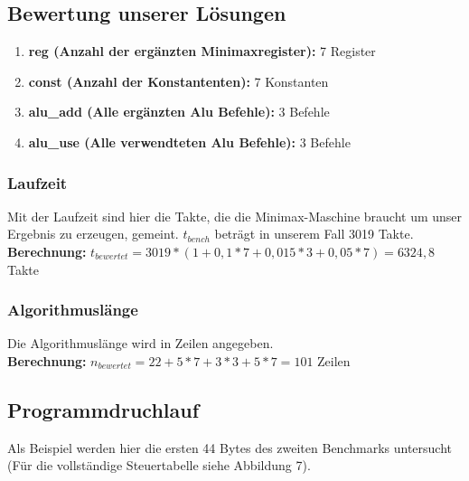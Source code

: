\documentclass[12pt,titlepage]{article}
\begin{document}
\subsection{Bewertung unserer Lösungen}

\begin{enumerate}
\item \textbf{reg (Anzahl der ergänzten Minimaxregister): } 7 Register
\item \textbf{const (Anzahl der Konstantenten): } 7 Konstanten
\item \textbf{alu\_add (Alle erg{\"a}nzten Alu Befehle):} 3 Befehle
\item \textbf{alu\_use (Alle verwendteten Alu Befehle):} 3 Befehle
\end{enumerate}

\subsubsection{Laufzeit}
Mit der Laufzeit sind hier die Takte, die die Minimax-Maschine braucht um unser Ergebnis zu erzeugen, gemeint. $t_{bench}$ betr{\"a}gt in unserem Fall 3019 Takte.\\

\textbf{Berechnung:} $t_{bewertet} = 3019 * (1 + 0,1*7 + 0,015*3 + 0,05 * 7) = 6324,8$ Takte

\subsubsection{Algorithmuslänge}
Die Algorithmuslänge wird in Zeilen angegeben.\\

\textbf{Berechnung:} $n_{bewertet} = 22 + 5*7 + 3*3 + 5*7 = 101$ Zeilen


\newpage

\subsection{Programmdruchlauf}
Als Beispiel werden hier die ersten 44 Bytes des zweiten Benchmarks untersucht (Für die vollständige Steuertabelle siehe Abbildung 7).

\leavevmode \\
\end{document}
